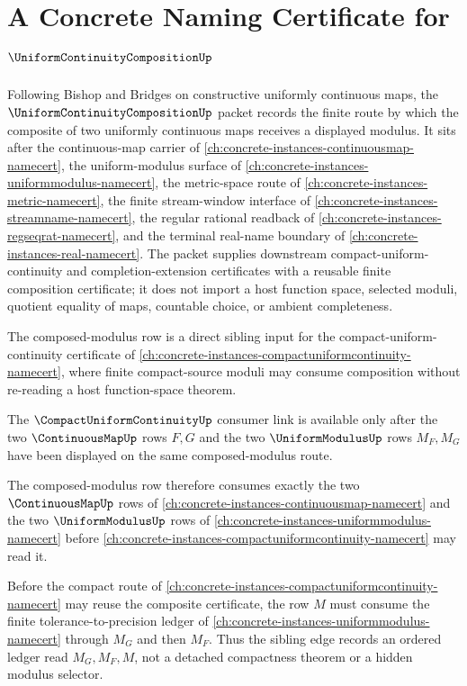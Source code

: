 \chapter{A Concrete Naming Certificate for $\UniformContinuityCompositionUp$}
\label{ch:concrete-instances-uniform-continuity-composition-namecert}

Following Bishop and Bridges on constructive uniformly continuous maps, the $\UniformContinuityCompositionUp$ packet records the finite route by which the composite of two uniformly continuous maps receives a displayed modulus. It sits after the continuous-map carrier of \autoref{ch:concrete-instances-continuousmap-namecert}, the uniform-modulus surface of \autoref{ch:concrete-instances-uniformmodulus-namecert}, the metric-space route of \autoref{ch:concrete-instances-metric-namecert}, the finite stream-window interface of \autoref{ch:concrete-instances-streamname-namecert}, the regular rational readback of \autoref{ch:concrete-instances-regseqrat-namecert}, and the terminal real-name boundary of \autoref{ch:concrete-instances-real-namecert}. The packet supplies downstream compact-uniform-continuity and completion-extension certificates with a reusable finite composition certificate; it does not import a host function space, selected moduli, quotient equality of maps, countable choice, or ambient completeness.

The composed-modulus row is a direct sibling input for the compact-uniform-continuity certificate of \autoref{ch:concrete-instances-compactuniformcontinuity-namecert}, where finite compact-source moduli may consume composition without re-reading a host function-space theorem.

The $\CompactUniformContinuityUp$ consumer link is available only after the two $\ContinuousMapUp$ rows $F,G$ and the two $\UniformModulusUp$ rows $M_F,M_G$ have been displayed on the same composed-modulus route.

The composed-modulus row therefore consumes exactly the two $\ContinuousMapUp$ rows of \autoref{ch:concrete-instances-continuousmap-namecert} and the two $\UniformModulusUp$ rows of \autoref{ch:concrete-instances-uniformmodulus-namecert} before \autoref{ch:concrete-instances-compactuniformcontinuity-namecert} may read it.

Before the compact route of \autoref{ch:concrete-instances-compactuniformcontinuity-namecert} may reuse the composite certificate, the row $M$ must consume the finite tolerance-to-precision ledger of \autoref{ch:concrete-instances-uniformmodulus-namecert} through $M_G$ and then $M_F$. Thus the sibling edge records an ordered ledger read $M_G,M_F,M$, not a detached compactness theorem or a hidden modulus selector.


